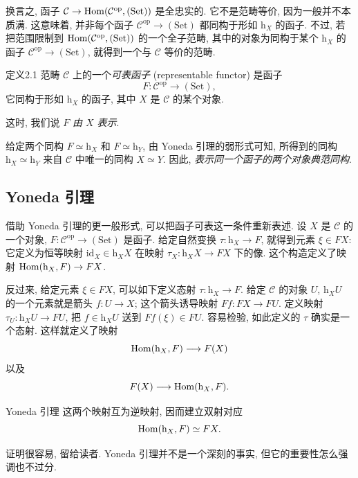 换言之, 函子 $\mathcal C\to\operatorname{Hom}(\mathcal C^{\mathrm{op}},(\mathrm{Set}))$ 是全忠实的. 它不是范畴等价, 因为一般并不本质满. 这意味着, 并非每个函子 $\mathcal C^{\mathrm{op}}\to(\mathrm{Set})$ 都同构于形如 $\mathrm h_X$ 的函子. 不过, 若把范围限制到 $\operatorname{Hom}(\mathcal C^{\mathrm{op}},(\mathrm{Set}))$ 的一个全子范畴, 其中的对象为同构于某个 $\mathrm h_X$ 的函子 $\mathcal C^{\mathrm{op}}\to(\mathrm{Set})$, 就得到一个与 $\mathcal C$ 等价的范畴.

\begin{origstatement}{定义}{2.1}\label{ch02:def21}
范畴 $\mathcal C$ 上的一个\emph{可表函子} (representable functor) 是函子
\[
F:\mathcal C^{\mathrm{op}}\longrightarrow(\mathrm{Set}),
\]
它同构于形如 $\mathrm h_X$ 的函子, 其中 $X$ 是 $\mathcal C$ 的某个对象.

这时, 我们说 $F$ \emph{由 $X$ 表示}.
\end{origstatement}

给定两个同构 $F\simeq\mathrm h_X$ 和 $F\simeq\mathrm h_Y$, 由 Yoneda 引理的弱形式可知, 所得到的同构 $\mathrm h_X\simeq\mathrm h_Y$ 来自 $\mathcal C$ 中唯一的同构 $X\simeq Y$. 因此, \emph{表示同一个函子的两个对象典范同构}.

\subsection{Yoneda 引理}
借助 Yoneda 引理的更一般形式, 可以把函子可表这一条件重新表述. 设 $X$ 是 $\mathcal C$ 的一个对象, $F:\mathcal C^{\mathrm{op}}\to(\mathrm{Set})$ 是函子. 给定自然变换 $\tau:\mathrm h_X\to F$, 就得到元素 $\xi\in FX$: 它定义为恒等映射 $\mathrm{id}_X\in\mathrm h_XX$ 在映射 $\tau_X:\mathrm h_XX\to FX$ 下的像. 这个构造定义了映射 $\operatorname{Hom}(\mathrm h_X,F)\to FX$.

反过来, 给定元素 $\xi\in FX$, 可以如下定义态射 $\tau:\mathrm h_X\to F$. 给定 $\mathcal C$ 的对象 $U$, $\mathrm h_XU$ 的一个元素就是箭头 $f:U\to X$; 这个箭头诱导映射 $Ff:FX\to FU$. 定义映射 $\tau_U:\mathrm h_XU\to FU$, 把 $f\in\mathrm h_XU$ 送到 $Ff(\xi)\in FU$. 容易检验, 如此定义的 $\tau$ 确实是一个态射. 这样就定义了映射
\[
\operatorname{Hom}(\mathrm h_X,F)\longrightarrow F(X)
\]
以及
\[
F(X)\longrightarrow\operatorname{Hom}(\mathrm h_X,F).
\]

\begin{origstatement}{Yoneda 引理}{}\label{ch02:yoneda}
这两个映射互为逆映射, 因而建立双射对应
\[
\operatorname{Hom}(\mathrm h_X,F)\simeq FX.
\]
\end{origstatement}

证明很容易, 留给读者. Yoneda 引理并不是一个深刻的事实, 但它的重要性怎么强调也不过分.

